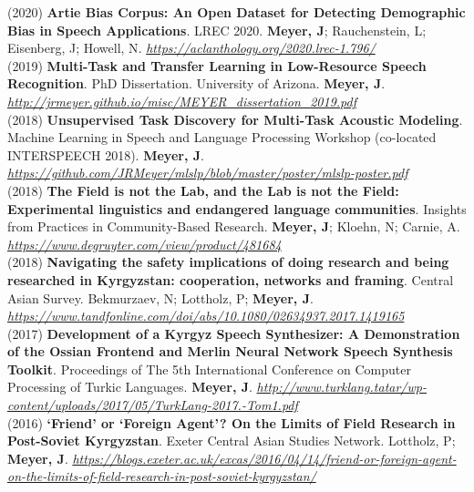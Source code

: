 \documentclass{resume} %
\begin{document}
{(2020)}
{\bf Artie Bias Corpus: An Open Dataset for Detecting Demographic Bias in Speech Applications}.
       {LREC 2020}.
       {\textbf{Meyer, J}; Rauchenstein, L; Eisenberg, J; Howell, N}.
       \emph{\url{https://aclanthology.org/2020.lrec-1.796/}}
       \\

{(2019)}
{\bf Multi-Task and Transfer Learning in Low-Resource Speech Recognition}.
       {PhD Dissertation. University of Arizona}.
       {\textbf{Meyer, J}}.
       \emph{\url{http://jrmeyer.github.io/misc/MEYER_dissertation_2019.pdf}}
       \\

{(2018)}
{\bf Unsupervised Task Discovery for Multi-Task Acoustic Modeling}.
       {Machine Learning in Speech and Language Processing Workshop (co-located INTERSPEECH 2018)}.
       {\textbf{Meyer, J}}.
       \emph{\url{https://github.com/JRMeyer/mlslp/blob/master/poster/mlslp-poster.pdf}}
       \\

{(2018)}
{\bf The Field is not the Lab, and the Lab is not the Field: Experimental linguistics and endangered language communities}.
       {Insights from Practices in Community-Based Research}.
       {\textbf{Meyer, J}; Kloehn, N; Carnie, A}.
       \emph{\url{https://www.degruyter.com/view/product/481684}}
       \\

{(2018)}
{\bf Navigating the safety implications of doing research and being researched in Kyrgyzstan: cooperation, networks and framing}.
       {Central Asian Survey}.
       {Bekmurzaev, N; Lottholz, P; \textbf{Meyer, J}}.
       \emph{\url{https://www.tandfonline.com/doi/abs/10.1080/02634937.2017.1419165}}
       \\

{(2017)}
{\bf Development of a Kyrgyz Speech Synthesizer: A Demonstration of the Ossian Frontend and Merlin Neural Network Speech Synthesis Toolkit}.
       {Proceedings of The 5th International Conference on Computer Processing of Turkic Languages}.
       {\textbf{Meyer, J}}.
       \emph{\url{http://www.turklang.tatar/wp-content/uploads/2017/05/TurkLang-2017.-Tom1.pdf}}
       \\

{(2016)}
{\bf ‘Friend’ or ‘Foreign Agent’? On the Limits of Field Research in Post-Soviet Kyrgyzstan}.
       {Exeter Central Asian Studies Network}.
       {Lottholz, P; \textbf{Meyer, J}}.
       \emph{\url{https://blogs.exeter.ac.uk/excas/2016/04/14/friend-or-foreign-agent-on-the-limits-of-field-research-in-post-soviet-kyrgyzstan/}}
       \\
\end{document}
